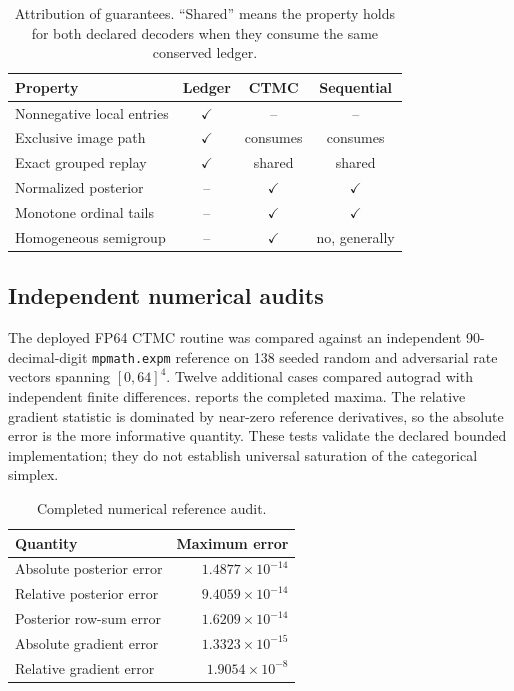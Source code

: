 \documentclass[10pt,twocolumn,letterpaper]{article}
\begin{document}
\begin{table}[t]
  \centering
  \caption{Attribution of guarantees.  ``Shared'' means the property holds for
  both declared decoders when they consume the same conserved ledger.}
  \label{tab:guarantees}
  \small
  \setlength{\tabcolsep}{3.6pt}
  \begin{tabular}{@{}p{3.15cm}ccc@{}}
    \toprule
    Property & Ledger & CTMC & Sequential \\
    \midrule
    Nonnegative local entries & $\checkmark$ & -- & -- \\
    Exclusive image path & $\checkmark$ & consumes & consumes \\
    Exact grouped replay & $\checkmark$ & shared & shared \\
    Normalized posterior & -- & $\checkmark$ & $\checkmark$ \\
    Monotone ordinal tails & -- & $\checkmark$ & $\checkmark$ \\
    Homogeneous semigroup & -- & $\checkmark$ & no, generally \\
    \bottomrule
  \end{tabular}
\end{table}

\subsection{Independent numerical audits}

The deployed FP64 CTMC routine was compared against an independent
90-decimal-digit \texttt{mpmath.expm} reference on 138 seeded random and
adversarial rate vectors spanning $[0,64]^4$.  Twelve additional cases compared
autograd with independent finite differences.  
reports the completed maxima.  The relative gradient statistic is dominated by
near-zero reference derivatives, so the absolute error is the more informative
quantity.  These tests validate the declared bounded implementation; they do
not establish universal saturation of the categorical simplex.

\begin{table}[t]
  \centering
  \caption{Completed numerical reference audit.}
  \label{tab:numeric-audit}
  \small
  \begin{tabular}{@{}lr@{}}
    \toprule
    Quantity & Maximum error \\
    \midrule
    Absolute posterior error & $1.4877\times10^{-14}$ \\
    Relative posterior error & $9.4059\times10^{-14}$ \\
    Posterior row-sum error & $1.6209\times10^{-14}$ \\
    Absolute gradient error & $1.3323\times10^{-15}$ \\
    Relative gradient error & $1.9054\times10^{-8}$ \\
    \bottomrule
  \end{tabular}
\end{table}
\end{document}
